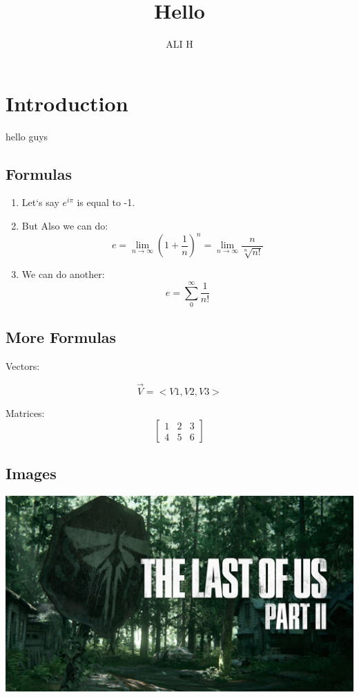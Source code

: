 \documentclass[12pt]{article}
\title{Hello}
\author{ALI H}
\date
\begin{document}
\maketitle

\section{Introduction}
hello guys

\subsection{Formulas}
\begin{enumerate}
\item 
Let`s say $e^{i\pi}$ is equal to -1. %
\item 
But Also we can do: 
$$ e = \lim_{n \to \infty } \left ( 1 + \frac{1}{n} \right ) ^n = \lim_{n \to \infty } \frac{n}{\sqrt[n]{n!}}$$
\item
We can do another:
$$ e = \sum_{0}^{\infty} \frac{1}{n!}$$
\end{enumerate}

\subsection{More Formulas}
\hspace{0.61cm}Vectors:

$$\vec{V} =<V1, V2, V3>$$

Matrices:
$$
\begin{bmatrix}
    1 & 2 & 3\\
    4 & 5 & 6
\end{bmatrix}
$$

\subsection{Images}

\includegraphics[scale = 0.1]{LOS2.jpg}
\end{document}
